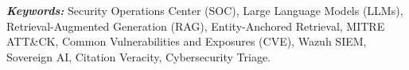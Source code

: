 \documentclass[12pt,a4paper,oneside]{report}
\begin{document}
\vspace{0.4cm}

\noindent
\textit{\textbf{Keywords:}}
Security Operations Center (SOC), Large Language Models (LLMs), Retrieval-Augmented Generation (RAG), Entity-Anchored Retrieval, MITRE ATT\&CK, Common Vulnerabilities and Exposures (CVE), Wazuh SIEM, Sovereign AI, Citation Veracity, Cybersecurity Triage.


\clearpage
{}
{}
{\setlength{\parskip}{0pt}\listoffigures}


\clearpage
{}
{}
{\setlength{\parskip}{0pt}\listoftables}


\clearpage
{}
{}
{\setlength{\parskip}{0pt}\tableofcontents}


\clearpage


\setcounter{page}{1}
\setlength{\parskip}{2pt}
\setlength{\parindent}{1.2em}

\pagestyle{fancy}
\fancyhf{}

\fancyhfoffset[L,R]{0.5in}

\fancyfoot[C]{\thepage}

\renewcommand{\headrulewidth}{0.4pt}
\renewcommand{\footrulewidth}{0.4pt}
\fancypagestyle{plain}{
    \fancyhf{}
    \fancyfoot[C]{\thepage}
    \renewcommand{\headrulewidth}{0.4pt}
    \renewcommand{\footrulewidth}{0.4pt}
}
\end{document}
